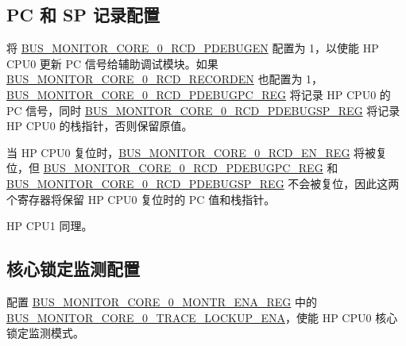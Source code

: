 \documentclass[main\_\_CN.tex]{subfiles}
\begin{document}
\subsection{PC 和 SP 记录配置}

将 \hyperref[fielddesc:BUSMONITORCORE0RCDPDEBUGEN]{BUS\_MONITOR\_CORE\_0\_RCD\_PDEBUGEN} 配置为 1，以使能 HP CPU0 更新 PC 信号给辅助调试模块。如果 \hyperref[fielddesc:BUSMONITORCORE0RCDRECORDEN]{BUS\_MONITOR\_CORE\_0\_RCD\_RECORDEN} 也配置为 1，\hyperref[regdesc:BUSMONITORCORE0RCDPDEBUGPCREG]{BUS\_MONITOR\_CORE\_0\_RCD\_PDEBUGPC\_REG} 将记录 HP CPU0 的 PC 信号，同时 \hyperref[regdesc:BUSMONITORCORE0RCDPDEBUGSPREG]{BUS\_MONITOR\_CORE\_0\_RCD\_PDEBUGSP\_REG} 将记录 HP CPU0 的栈指针，否则保留原值。

当 HP CPU0 复位时，\hyperref[regdesc:BUSMONITORCORE0RCDENREG]{BUS\_MONITOR\_CORE\_0\_RCD\_EN\_REG} 将被复位，但 \hyperref[regdesc:BUSMONITORCORE0RCDPDEBUGPCREG]{BUS\_MONITOR\_CORE\_0\_RCD\_PDEBUGPC\_REG} 和 \hyperref[regdesc:BUSMONITORCORE0RCDPDEBUGSPREG]{BUS\_MONITOR\_CORE\_0\_RCD\_PDEBUGSP\_REG} 不会被复位，因此这两个寄存器将保留 HP CPU0 复位时的 PC 值和栈指针。

HP CPU1 同理。

\subsection{核心锁定监测配置}

配置 \hyperref[regdesc:BUSMONITORCORE0MONTRENAREG]{BUS\_MONITOR\_CORE\_0\_MONTR\_ENA\_REG} 中的 \hyperref[fielddesc:BUSMONITORCORE0TRACELOCKUPENA]{BUS\_MONITOR\_CORE\_0\_TRACE\_LOCKUP\_ENA}，使能 HP CPU0 核心锁定监测模式。
\end{document}

